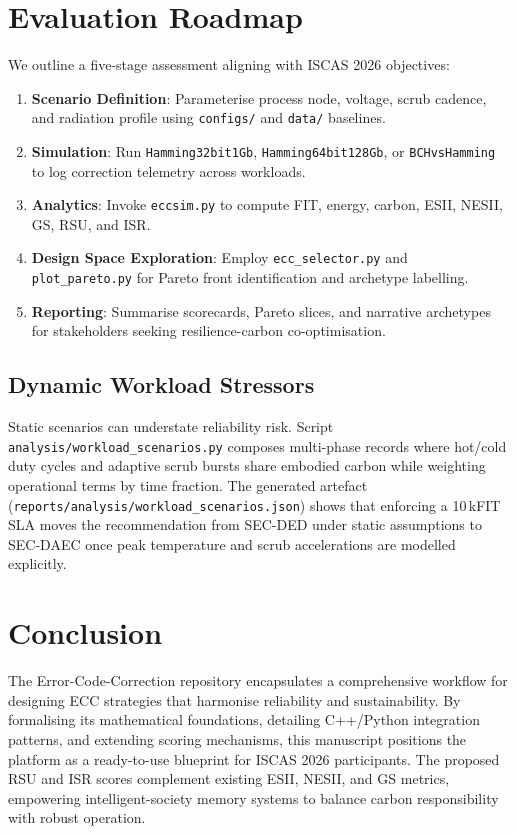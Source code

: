 \documentclass[conference]{IEEEtran}
\begin{document}
\section{Evaluation Roadmap}
We outline a five-stage assessment aligning with ISCAS 2026 objectives:
\begin{enumerate}
    \item \textbf{Scenario Definition}: Parameterise process node, voltage, scrub cadence, and radiation profile using \texttt{configs/} and \texttt{data/} baselines.
    \item \textbf{Simulation}: Run \texttt{Hamming32bit1Gb}, \texttt{Hamming64bit128Gb}, or \texttt{BCHvsHamming} to log correction telemetry across workloads.
    \item \textbf{Analytics}: Invoke \texttt{eccsim.py} to compute FIT, energy, carbon, ESII, NESII, GS, RSU, and ISR.
    \item \textbf{Design Space Exploration}: Employ \texttt{ecc\_selector.py} and \texttt{plot\_pareto.py} for Pareto front identification and archetype labelling.
    \item \textbf{Reporting}: Summarise scorecards, Pareto slices, and narrative archetypes for stakeholders seeking resilience-carbon co-optimisation.
\end{enumerate}

\subsection{Dynamic Workload Stressors}
Static scenarios can understate reliability risk.  Script \texttt{analysis/workload\_scenarios.py} composes multi-phase records where hot/cold duty cycles and adaptive scrub bursts share embodied carbon while weighting operational terms by time fraction.  The generated artefact (\texttt{reports/analysis/workload\_scenarios.json}) shows that enforcing a 10\,kFIT SLA moves the recommendation from SEC-DED under static assumptions to SEC-DAEC once peak temperature and scrub accelerations are modelled explicitly.
\section{Conclusion}
The Error-Code-Correction repository encapsulates a comprehensive workflow for designing ECC strategies that harmonise reliability and sustainability.
By formalising its mathematical foundations, detailing C++/Python integration patterns, and extending scoring mechanisms, this manuscript positions the platform as a ready-to-use blueprint for ISCAS 2026 participants.
The proposed RSU and ISR scores complement existing ESII, NESII, and GS metrics, empowering intelligent-society memory systems to balance carbon responsibility with robust operation.
\end{document}

